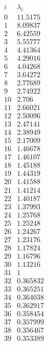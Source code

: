 \documentclass[12pt]{article}
\begin{document}
{$$
\begin{array}{|r|r|}
\hline
 i  & \lambda_i  \\
\hline
\hline
0 & 11.5175\\
\hline
1 & 8.09837\\
\hline
2 & 6.42559\\
\hline
3 & 5.55777\\
\hline
4 & 4.41364\\
\hline
5 & 4.29016\\
\hline
6 & 4.04268\\
\hline
7 & 3.64272\\
\hline
8 & 2.77689\\
\hline
9 & 2.74922\\
\hline
10 & 2.706\\
\hline
11 & 2.66021\\
\hline
12 & 2.50096\\
\hline
13 & 2.47141\\
\hline
14 & 2.38949\\
\hline
15 & 2.17009\\
\hline
16 & 1.46678\\
\hline
17 & 1.46107\\
\hline
18 & 1.45188\\
\hline
19 & 1.44319\\
\hline
20 & 1.41588\\
\hline
21 & 1.41214\\
\hline
22 & 1.40187\\
\hline
23 & 1.37993\\
\hline
24 & 1.25768\\
\hline
25 & 1.25248\\
\hline
26 & 1.24267\\
\hline
27 & 1.23176\\
\hline
28 & 1.17824\\
\hline
29 & 1.16796\\
\hline
30 & 1.13216\\
\hline
31 & 1\\
\hline
32 & 0.365832\\
\hline
33 & 0.365251\\
\hline
34 & 0.364038\\
\hline
35 & 0.362917\\
\hline
36 & 0.358454\\
\hline
37 & 0.357999\\
\hline
38 & 0.356467\\
\hline
39 & 0.353389\\

\end{array}$$}
\end{document}
